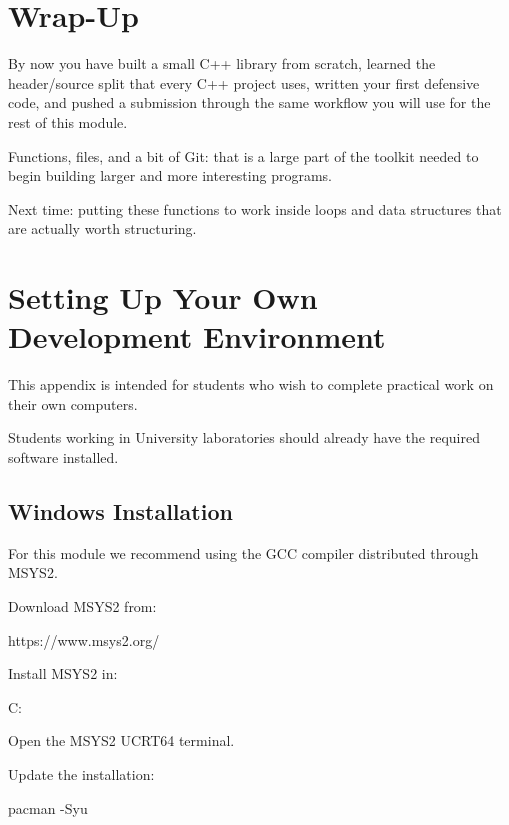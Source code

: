 \documentclass{csc2059practical}
\begin{document}
\section{Wrap-Up}

\begin{wrapupbox}
By now you have built a small C++ library from scratch, learned the header/source split that every C++ project uses, written your first defensive code, and pushed a submission through the same workflow you will use for the rest of this module.

Functions, files, and a bit of Git: that is a large part of the toolkit needed to begin building larger and more interesting programs.

Next time: putting these functions to work inside loops and data structures that are actually worth structuring.
\end{wrapupbox}

\startappendices

\section{Setting Up Your Own Development Environment}

This appendix is intended for students who wish to complete practical work on their own computers.

Students working in University laboratories should already have the required software installed.

\subsection{Windows Installation}

For this module we recommend using the GCC compiler distributed through MSYS2.

Download MSYS2 from:

\begin{terminal}
https://www.msys2.org/
\end{terminal}

Install MSYS2 in:

\begin{terminal}
C:\Apps{}
\end{terminal}

Open the MSYS2 UCRT64 terminal.

Update the installation:

\begin{bashcode}
pacman -Syu
\end{bashcode}
\end{document}

